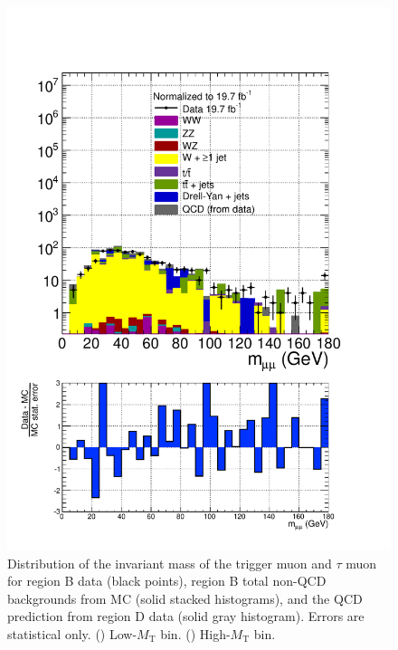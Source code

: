 \begin{figure}[hbtp]
\begin{center}
    \includegraphics[width=\cmsFigWidth]{figures/dataVsMCQCD_mWMuTauMu_highMT_v87}
    \caption{Distribution of the invariant mass of the trigger muon and $\tau$ muon for region B data (black points), region B total non-QCD backgrounds from MC (solid stacked histograms), and the QCD prediction from region D data (solid gray histogram).  Errors are statistical only. (\cmsLeft) Low-$M_{\text{T}}$ bin. (\cmsRight) High-$M_{\text{T}}$ bin.}
    \label{fig:regB-data-MC-mWMuTauMu}
  \end{center}
\end{figure}

